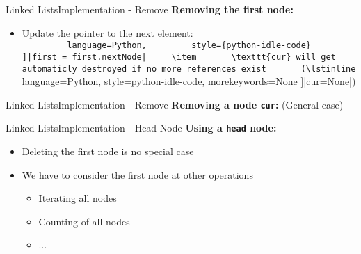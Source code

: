 
\begin{frame}{Linked Lists}{Implementation - Remove}
  \textbf{Removing the first node:}
  \begin{itemize}
    \item
      Update the pointer to the next element:\\
      \lstinline[
        language=Python,
        style={python-idle-code}
      ]|first = first.nextNode|
    \item
      \texttt{cur} will get automaticly destroyed if no more references exist
      (\lstinline[
        language=Python,
        style={python-idle-code},
        morekeywords={None}
      ]|cur=None|)
  \end{itemize}
  \begin{flushright}
    
  \end{flushright}
\end{frame}


\begin{frame}[fragile]{Linked Lists}{Implementation - Remove}
  \textbf{Removing a node \texttt{cur}:} (General case)
  
\end{frame}


\begin{frame}{Linked Lists}{Implementation - Head Node}
  \textbf{Using a \texttt{head} node:}
  \begin{itemize}
    \item
      Deleting the first node is no special case
    \item
      We have to consider the first node at other operations
      \begin{itemize}
        \item
          Iterating all nodes
        \item
          Counting of all nodes
        \item
          $\dots$
      \end{itemize}
  \end{itemize}
  \begin{flushleft}
    
  \end{flushleft}
\end{frame}

